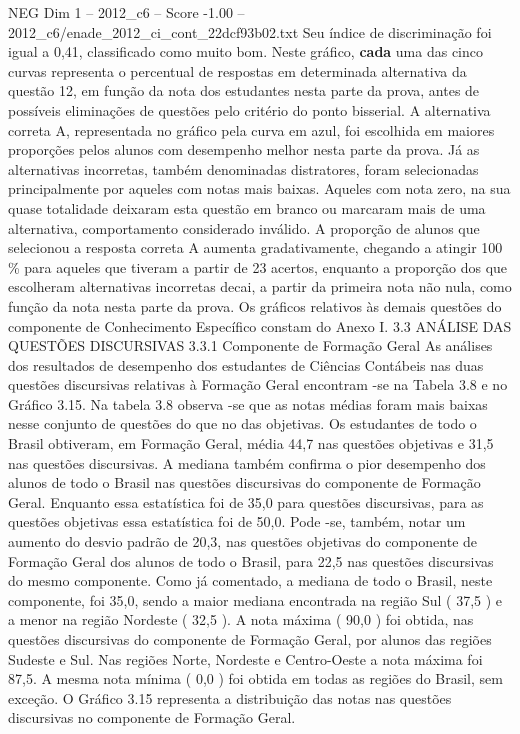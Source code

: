 \begin{textsample}{NEG Dim 1 – 2012\_c6 – Score -1.00 – 2012\_c6/enade\_2012\_ci\_cont\_22dcf93b02.txt}
Seu índice de discriminação foi igual a 0,41, classificado como muito bom.
Neste gráfico, \textbf{cada} uma das cinco curvas representa o percentual de respostas em determinada alternativa da questão 12, em função da nota dos estudantes nesta parte da prova, antes de possíveis eliminações de questões pelo critério do ponto bisserial.
A alternativa correta A, representada no gráfico pela curva em azul, foi escolhida em maiores proporções pelos alunos com desempenho melhor nesta parte da prova.
Já as alternativas incorretas, também denominadas distratores, foram selecionadas principalmente por aqueles com notas mais baixas.
Aqueles com nota zero, na sua quase totalidade deixaram esta questão em branco ou marcaram mais de uma alternativa, comportamento considerado inválido.
A proporção de alunos que selecionou a resposta correta A aumenta gradativamente, chegando a atingir 100 \% para aqueles que tiveram a partir de 23 acertos, enquanto a proporção dos que escolheram alternativas incorretas decai, a partir da primeira nota não nula, como função da nota nesta parte da prova.
Os gráficos relativos às demais questões do componente de Conhecimento Específico constam do Anexo I. 3.3 ANÁLISE DAS QUESTÕES DISCURSIVAS 3.3.1 Componente de Formação Geral As análises dos resultados de desempenho dos estudantes de Ciências Contábeis nas duas questões discursivas relativas à Formação Geral encontram -se na Tabela 3.8 e no Gráfico 3.15.
Na tabela 3.8 observa -se que as notas médias foram mais baixas nesse conjunto de questões do que no das objetivas.
Os estudantes de todo o Brasil obtiveram, em Formação Geral, média 44,7 nas questões objetivas e 31,5 nas questões discursivas.
A mediana também confirma o pior desempenho dos alunos de todo o Brasil nas questões discursivas do componente de Formação Geral.
Enquanto essa estatística foi de 35,0 para questões discursivas, para as questões objetivas essa estatística foi de 50,0.
Pode -se, também, notar um aumento do desvio padrão de 20,3, nas questões objetivas do componente de Formação Geral dos alunos de todo o Brasil, para 22,5 nas questões discursivas do mesmo componente.
Como já comentado, a mediana de todo o Brasil, neste componente, foi 35,0, sendo a maior mediana encontrada na região Sul ( 37,5 ) e a menor na região Nordeste ( 32,5 ).
A nota máxima ( 90,0 ) foi obtida, nas questões discursivas do componente de Formação Geral, por alunos das regiões Sudeste e Sul.
Nas regiões Norte, Nordeste e Centro-Oeste a nota máxima foi 87,5.
A mesma nota mínima ( 0,0 ) foi obtida em todas as regiões do Brasil, sem exceção.
O Gráfico 3.15 representa a distribuição das notas nas questões discursivas no componente de Formação Geral.

\end{textsample}
